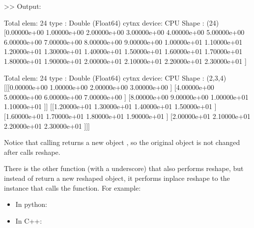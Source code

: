 \documentclass[letterpaper,10pt,english]{sphinxmanual}
\begin{document}
\textgreater{}\textgreater{} Output:

\begin{sphinxVerbatim}[commandchars=\\\{\}]
Total elem: 24
type  : Double (Float64)
cytnx device: CPU
Shape : (24)
[0.00000e+00 1.00000e+00 2.00000e+00 3.00000e+00 4.00000e+00 5.00000e+00 6.00000e+00 7.00000e+00 8.00000e+00 9.00000e+00 1.00000e+01 1.10000e+01 1.20000e+01 1.30000e+01 1.40000e+01 1.50000e+01 1.60000e+01 1.70000e+01 1.80000e+01 1.90000e+01 2.00000e+01 2.10000e+01 2.20000e+01 2.30000e+01 ]

Total elem: 24
type  : Double (Float64)
cytnx device: CPU
Shape : (2,3,4)
[[[0.00000e+00 1.00000e+00 2.00000e+00 3.00000e+00 ]
  [4.00000e+00 5.00000e+00 6.00000e+00 7.00000e+00 ]
  [8.00000e+00 9.00000e+00 1.00000e+01 1.10000e+01 ]]
 [[1.20000e+01 1.30000e+01 1.40000e+01 1.50000e+01 ]
  [1.60000e+01 1.70000e+01 1.80000e+01 1.90000e+01 ]
  [2.00000e+01 2.10000e+01 2.20000e+01 2.30000e+01 ]]]
\end{sphinxVerbatim}

Notice that calling  returns a new object , so the original object  is not changed after calls reshape.

There is the other function  (with a underscore) that also performs reshape, but instead of return a new reshaped object, it performs inplace reshape to the instance that calls the function. For example:
\begin{itemize}
\item {} 
In python:

\end{itemize}

\begin{sphinxVerbatim}[commandchars=\\\{\},numbers=left,firstnumber=1,stepnumber=1]
  
\end{sphinxVerbatim}
\begin{itemize}
\item {} 
In C++:

\end{itemize}
\end{document}
